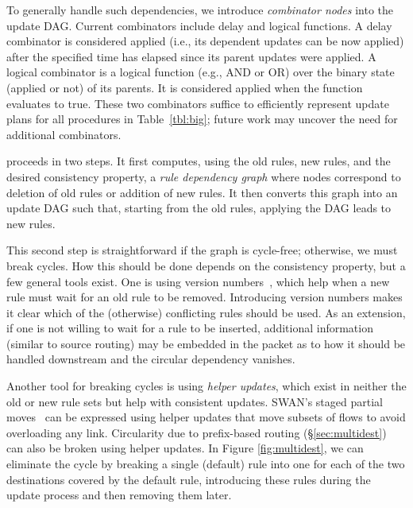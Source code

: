 To generally handle such dependencies, we introduce {\em combinator nodes} into the update DAG. Current combinators include delay and logical functions. A delay combinator is considered applied (i.e., its dependent updates can be now applied) after the specified time has elapsed since its parent updates were applied. A logical combinator is a logical function (e.g., AND or OR) over the binary state (applied or not) of its parents. It is considered applied when the function evaluates to true. These two combinators suffice to efficiently represent update plans for all procedures in Table~\ref{tbl:big}; future work may uncover the need for additional combinators.

 proceeds in two steps. It first computes, using the old rules, new rules, and the desired consistency property, a {\em rule dependency graph} where nodes correspond to deletion of old rules or addition of new rules. It then converts this graph into an update DAG such that, starting from the old rules, applying the DAG leads to new rules.

This second step is straightforward if the graph is cycle-free; otherwise, we must break cycles. How this should be done depends on the consistency property, but a few general tools exist. One is using version numbers~\cite{safeupdate}, which help when a new rule must wait for an old rule to be removed. Introducing version numbers makes it clear which of the (otherwise) conflicting rules should be used. As an extension, if one is not willing to wait for a rule to be inserted, additional information (similar to source routing) may be embedded in the packet as to how it should be handled downstream  and the circular dependency vanishes.

Another tool for breaking cycles is using {\em helper updates}, which exist in neither the old or new rule sets but help with consistent updates. SWAN's staged partial moves~\cite{swan} can be expressed using helper updates that move subsets of flows to avoid overloading any link. Circularity due to prefix-based routing (\S\ref{sec:multidest}) can also be broken using helper updates. In Figure \ref{fig:multidest}, we can eliminate the cycle by breaking a single (default) rule into one for each of the two destinations covered by the default rule, introducing these rules during the update process and then removing them later.

%

